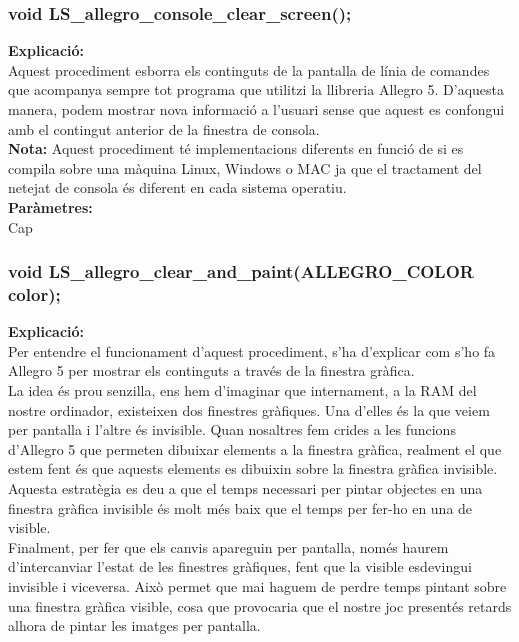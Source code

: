 \documentclass[11pt]{article}
\begin{document}
\subsubsection{void LS\_allegro\_console\_clear\_screen();}
\textbf{Explicació:}\\
Aquest procediment esborra els continguts de la pantalla de línia de comandes que acompanya sempre tot programa que utilitzi la llibreria Allegro 5. D'aquesta manera, podem mostrar nova informació a l'usuari sense que aquest es confongui amb el contingut anterior de la finestra de consola.\\

\noindent \textbf{Nota:} Aquest procediment té implementacions diferents en funció de si es compila sobre una màquina Linux, Windows o MAC ja que el tractament del netejat de consola és diferent en cada sistema operatiu.\\

\noindent \textbf{Paràmetres:}\\ Cap

\subsubsection{void LS\_allegro\_clear\_and\_paint(ALLEGRO\_COLOR color);}
\textbf{Explicació:}\\
Per entendre el funcionament d'aquest procediment, s'ha d'explicar com s'ho fa Allegro 5 per mostrar els continguts a través de la finestra gràfica.\\

\noindent La idea és prou senzilla, ens hem d'imaginar que internament, a la RAM del nostre ordinador, existeixen dos finestres gràfiques. Una d'elles és la que veiem per pantalla i l'altre és invisible. Quan nosaltres fem crides a les funcions d'Allegro 5 que permeten dibuixar elements a la finestra gràfica, realment el que estem fent és que aquests elements es dibuixin sobre la finestra gràfica invisible. Aquesta estratègia es deu a que el temps necessari per pintar objectes en una finestra gràfica invisible és molt més baix que el temps per fer-ho en una de visible. \\

\noindent Finalment, per fer que els canvis apareguin per pantalla, només haurem d'intercanviar l'estat de les finestres gràfiques, fent que la visible esdevingui invisible i viceversa. Això permet que mai haguem de perdre temps pintant sobre una finestra gràfica visible, cosa que provocaria que el nostre joc presentés retards alhora de pintar les imatges per pantalla.\\
\end{document}

